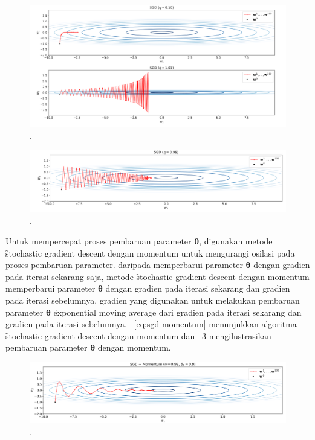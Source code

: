 \begin{figure}
    \centering
    \includegraphics[width=1\textwidth]{assets/pics/learning-rate-bad.png}
    \caption{\license.}
    \label{fig:learning-rate-bad}
\end{figure}

\begin{figure}
    \centering
    \includegraphics[width=1\textwidth]{assets/pics/learning-rate-good.png}
    \caption{\license.}
    \label{fig:learning-rate-good}
\end{figure}

Untuk mempercepat proses pembaruan parameter $\bm{\theta}$, digunakan metode \f{stochastic gradient descent} dengan momentum untuk mengurangi osilasi pada proses pembaruan parameter. daripada memperbarui parameter $\bm{\theta}$ dengan gradien pada iterasi sekarang saja, metode \f{stochastic gradient descent} dengan momentum memperbarui parameter $\bm{\theta}$ dengan gradien pada iterasi sekarang dan gradien pada iterasi sebelumnya. gradien yang digunakan untuk melakukan pembaruan parameter $\bm{\theta}$ \f{exponential moving average} dari gradien pada iterasi sekarang dan gradien pada iterasi sebelumnya. \equ~\ref{eq:sgd-momentum} menunjukkan algoritma \f{stochastic gradient descent} dengan momentum dan \pic~\ref{fig:sgd-momentum} mengilustrasikan pembaruan parameter $\bm{\theta}$ dengan momentum.

\begin{figure}
    \centering
    \includegraphics[width=1\textwidth]{assets/pics/sgd-momentum.png}
    \caption{\license.}
    \label{fig:sgd-momentum}
\end{figure}

